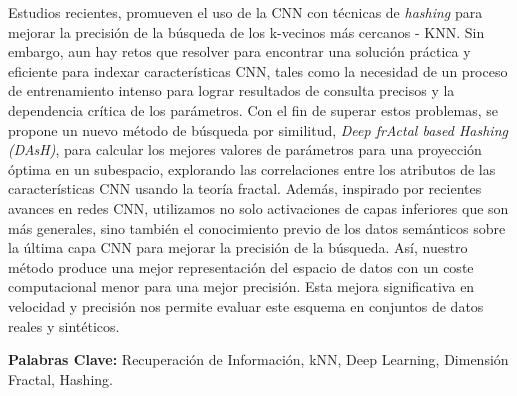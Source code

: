 Estudios recientes, promueven el uso de la \acf{CNN} con técnicas de  \textit{hashing} para mejorar la precisión de la búsqueda de los k-vecinos más cercanos - KNN.  Sin embargo, aun hay retos que resolver para encontrar una solución práctica y eficiente para indexar características  CNN, tales como la necesidad de un proceso de entrenamiento intenso para lograr resultados de consulta precisos y la dependencia crítica de los parámetros.   Con el fin de superar estos problemas, se propone un nuevo método de búsqueda por similitud, \textit{Deep frActal based  Hashing (DAsH)}, para calcular los mejores valores de parámetros  para una proyección óptima en un subespacio, explorando las correlaciones entre los atributos de las características  CNN usando la teoría fractal. Además, inspirado por recientes avances  en redes CNN, utilizamos no solo activaciones de capas inferiores que son más generales, sino también el conocimiento previo de los datos semánticos sobre la última capa CNN para mejorar la precisión de la búsqueda.  Así, nuestro método produce una mejor representación del espacio de datos con un coste computacional menor para una mejor precisión. Esta mejora  significativa en velocidad y precisión nos permite evaluar este esquema en conjuntos de datos reales y sintéticos.



\singlespacing
\vspace*{0.5cm} \noindent \textbf{Palabras Clave:}  Recuperación de Información, kNN, Deep Learning, Dimensión Fractal, Hashing.

 
 